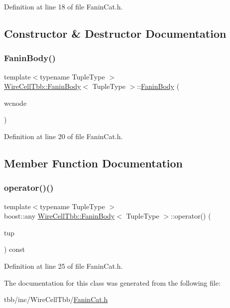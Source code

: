 Definition at line 18 of file Fanin\+Cat.\+h.



\subsection{Constructor \& Destructor Documentation}
\mbox{\label{class_wire_cell_tbb_1_1_fanin_body_aee5c583d48127db0d04b41bedafa5b87}} 
\subsubsection{\texorpdfstring{Fanin\+Body()}{FaninBody()}}
{\footnotesize\ttfamily template$<$typename Tuple\+Type $>$ \\
\hyperlink{class_wire_cell_tbb_1_1_fanin_body}{Wire\+Cell\+Tbb\+::\+Fanin\+Body}$<$ Tuple\+Type $>$\+::\hyperlink{class_wire_cell_tbb_1_1_fanin_body}{Fanin\+Body} (\begin{DoxyParamCaption}\item[{\hyperlink{class_wire_cell_1_1_interface_a09c548fb8266cfa39afb2e74a4615c37}{Wire\+Cell\+::\+I\+Node\+::pointer}}]{wcnode }\end{DoxyParamCaption})\hspace{0.3cm}{\ttfamily [inline]}}



Definition at line 20 of file Fanin\+Cat.\+h.



\subsection{Member Function Documentation}
\mbox{\label{class_wire_cell_tbb_1_1_fanin_body_a3f3dea7753a753932a569271f1a0589c}} 
\subsubsection{\texorpdfstring{operator()()}{operator()()}}
{\footnotesize\ttfamily template$<$typename Tuple\+Type $>$ \\
boost\+::any \hyperlink{class_wire_cell_tbb_1_1_fanin_body}{Wire\+Cell\+Tbb\+::\+Fanin\+Body}$<$ Tuple\+Type $>$\+::operator() (\begin{DoxyParamCaption}\item[{const Tuple\+Type \&}]{tup }\end{DoxyParamCaption}) const\hspace{0.3cm}{\ttfamily [inline]}}



Definition at line 25 of file Fanin\+Cat.\+h.



The documentation for this class was generated from the following file\+:\begin{DoxyCompactItemize}
\item 
tbb/inc/\+Wire\+Cell\+Tbb/\hyperlink{_fanin_cat_8h}{Fanin\+Cat.\+h}\end{DoxyCompactItemize}
